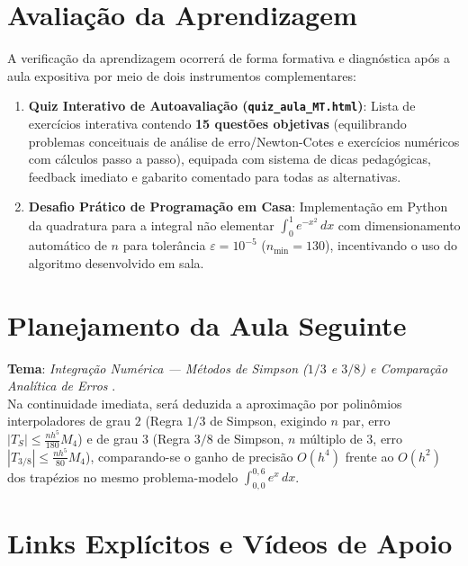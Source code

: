 \documentclass[11pt,a4paper]{article}
\begin{document}
\section{Avaliação da Aprendizagem}

A verificação da aprendizagem ocorrerá de forma formativa e diagnóstica após a aula expositiva por meio de dois instrumentos complementares:
\begin{enumerate}[leftmargin=1.5em]
    \item \textbf{Quiz Interativo de Autoavaliação (\texttt{quiz\_aula\_MT.html})}: Lista de exercícios interativa contendo \textbf{15 questões objetivas} (equilibrando problemas conceituais de análise de erro/Newton-Cotes e exercícios numéricos com cálculos passo a passo), equipada com sistema de dicas pedagógicas, feedback imediato e gabarito comentado para todas as alternativas.
    \item \textbf{Desafio Prático de Programação em Casa}: Implementação em Python da quadratura para a integral não elementar $\int_0^1 e^{-x^2}\,dx$ com dimensionamento automático de $n$ para tolerância $\varepsilon = 10^{-5}$ ($n_{\min} = 130$), incentivando o uso do algoritmo desenvolvido em sala.
\end{enumerate}

\section{Planejamento da Aula Seguinte}

\textbf{Tema}: \emph{Integração Numérica --- Métodos de Simpson ($1/3$ e $3/8$) e Comparação Analítica de Erros} \cite{mesquita2026, santos2010}.\\
Na continuidade imediata, será deduzida a aproximação por polinômios interpoladores de grau $2$ (Regra $1/3$ de Simpson, exigindo $n$ par, erro $|T_S| \le \frac{nh^5}{180}M_4$) e de grau $3$ (Regra $3/8$ de Simpson, $n$ múltiplo de $3$, erro $|T_{3/8}| \le \frac{nh^5}{80}M_4$), comparando-se o ganho de precisão $O(h^4)$ frente ao $O(h^2)$ dos trapézios no mesmo problema-modelo $\int_{0,0}^{0,6} e^x\,dx$.

\section{Links Explícitos e Vídeos de Apoio}
\end{document}
